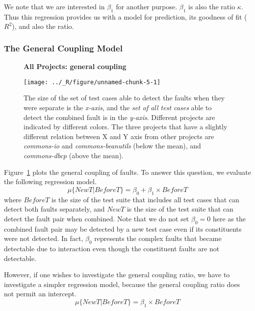 \documentclass[preprint,nonatbib]{sigplanconf}\usepackage[]{graphicx}\usepackage[]{color}
\begin{document}
We note that we are interested in $\beta_1$ for another purpose. $\beta_1$ is
also the \couplingC ratio $\kappa$. Thus this regression provides us with
a model for prediction, its goodness of fit ($R^2$), and also the \couplingC ratio.

\subsubsection{The General Coupling Model}
\begin{figure}[t]
\centering\textbf{All Projects: general coupling}\par\medskip


{\centering \texttt{[image: ../\_R/figure/unnamed-chunk-5-1]} 

}


\caption{The size of the set of test cases able to detect
  the faults when they were separate is the \emph{x-axis},
  and the \emph{set of all test cases} able to detect the combined fault is in the \emph{y-axis}. Different projects
are indicated by different colors.
The three projects that have a slightly different relation between X and Y axis from other projects are \emph{commons-io} and \emph{commons-beanutils} (below the mean), and \emph{commons-dbcp} (above the mean).
}
\label{fig:allfaults1}
\end{figure}
Figure~\ref{fig:allfaults1} plots the general coupling of faults.
To answer this question, we evaluate the following regression model.
\begin{equation}
\mu\{NewT | BeforeT \} = \beta_0 + \beta_1 \times BeforeT
\label{eq:e2}
\end{equation}
where $BeforeT$ is the size of the test suite that includes all test cases that
can detect both faults separately, and $NewT$ is the size of the test suite
that can detect the fault pair when combined.
Note that we do not set $\beta_0 = 0$ here as the combined fault pair may be
detected by a new test case even if its constituents were not detected. In fact,
$\beta_0$ represents the complex faults that became detectable due to
interaction even though the constituent faults are not detectable.

However, if one wishes to investigate the general coupling ratio, we have to
investigate a simpler regression model, because the general coupling ratio does
not permit an intercept.
\begin{equation}
\mu\{NewT | BeforeT \} = \beta_1 \times BeforeT
\label{eq:e3}
\end{equation}
\end{document}
